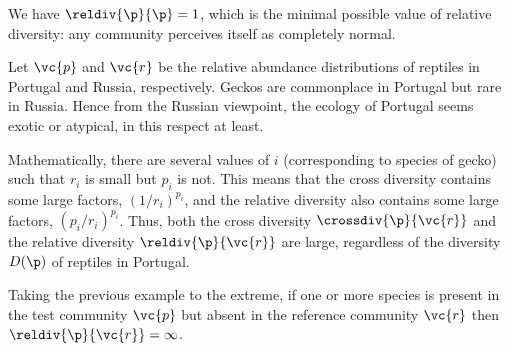 \begin{example}
We have $\reldiv{\p}{\p} = 1$, which is the minimal
possible value of relative diversity: any community perceives itself as
completely normal.
\end{example}

\begin{example}
% 
Let $\vc{p}$ and $\vc{r}$ be the relative abundance distributions of
reptiles in Portugal and Russia, respectively.  Geckos are
commonplace in Portugal but rare in Russia.  Hence from the Russian
viewpoint, the ecology of Portugal seems exotic or atypical, in this
respect at least.

Mathematically, there are several values of $i$ (corresponding to species
of gecko) such that $r_i$ is small but $p_i$ is not.  This means
that the cross diversity contains some large factors, $(1/r_i)^{p_i}$, and
the relative diversity also contains some large factors, $(p_i/r_i)^{p_i}$.
Thus, both the cross diversity $\crossdiv{\p}{\vc{r}}$ and the relative
diversity $\reldiv{\p}{\vc{r}}$ are large, regardless of the diversity
$D(\p)$ of reptiles in Portugal.
\end{example}

\begin{example}
Taking the previous example to the extreme, if one or more species is
present in the test community $\vc{p}$ but absent in the reference
community $\vc{r}$ then $\reldiv{\p}{\vc{r}} = \infty$.
\end{example}

